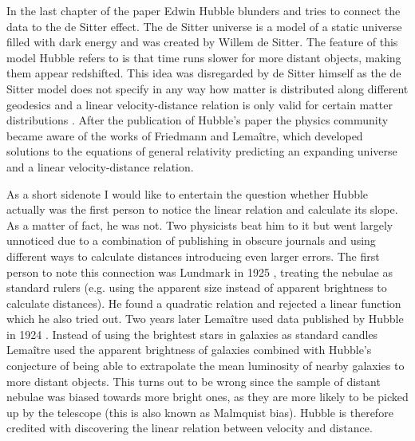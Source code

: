 In the last chapter of the paper Edwin Hubble blunders and tries to connect the data to the de Sitter effect. The de Sitter universe is a model of a static universe filled with dark energy and was created by Willem de Sitter. The feature of this model Hubble refers to is that time runs slower for more distant objects, making them appear redshifted. This idea was disregarded by de Sitter himself \autocite{deSitter1930proceedings} as the de Sitter model does not specify in any way how matter is distributed along different geodesics and a linear velocity-distance relation is only valid for certain matter distributions \autocite{deSitter}. After the publication of Hubble's paper the physics community became aware of the works of Friedmann and Lema\^{i}tre, which developed solutions to the equations of general relativity predicting an expanding universe and a linear velocity-distance relation. 

As a short sidenote I would like to entertain the question whether Hubble actually was the first person to notice the linear relation and calculate its slope. As a matter of fact, he was not. Two physicists beat him to it but went largely unnoticed due to a combination of publishing in obscure journals and using different ways to calculate distances introducing even larger errors. The first person to note this connection was Lundmark in 1925 \autocite{lundmark1925motions}, treating the nebulae as standard rulers (e.g. using the apparent size instead of apparent brightness to calculate distances). He found a quadratic relation and rejected a linear function which he also tried out. Two years later Lema\^{i}tre used data published by Hubble in 1924 \autocite{lemaitre1927univers}. Instead of using the brightest stars in galaxies as standard candles Lema\^{i}tre used the apparent brightness of galaxies combined with Hubble's conjecture of being able to extrapolate the mean luminosity of nearby galaxies to more distant objects. This turns out to be wrong since the sample of distant nebulae was biased towards more bright ones, as they are more likely to be picked up by the telescope (this is also known as Malmquist bias). Hubble is therefore credited with discovering the linear relation between velocity and distance. 


















